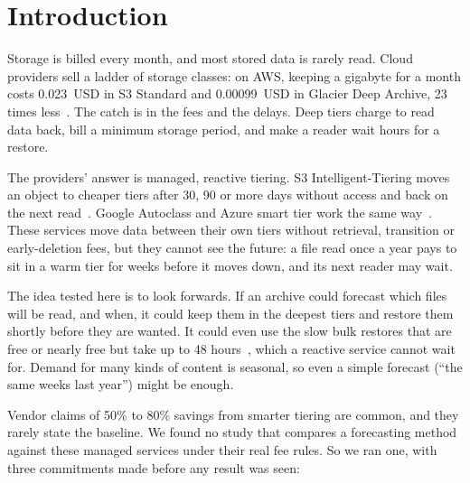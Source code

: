 \documentclass[11pt]{article}
\begin{document}
\vspace{0.3em}

\section{Introduction}

Storage is billed every month, and most stored data is rarely read. Cloud providers sell a ladder of storage classes: on AWS, keeping a gigabyte for a month costs 0.023~USD in S3 Standard and 0.00099~USD in Glacier Deep Archive, 23 times less~\cite{aws_s3_pricing}. The catch is in the fees and the delays. Deep tiers charge to read data back, bill a minimum storage period, and make a reader wait hours for a restore.

The providers' answer is managed, reactive tiering. S3 Intelligent-Tiering moves an object to cheaper tiers after 30, 90 or more days without access and back on the next read~\cite{aws_s3_it}. Google Autoclass and Azure smart tier work the same way~\cite{gcs_autoclass,azure_smart_tier}. These services move data between their own tiers without retrieval, transition or early-deletion fees, but they cannot see the future: a file read once a year pays to sit in a warm tier for weeks before it moves down, and its next reader may wait.

The idea tested here is to look forwards. If an archive could forecast which files will be read, and when, it could keep them in the deepest tiers and restore them shortly before they are wanted. It could even use the slow bulk restores that are free or nearly free but take up to 48 hours~\cite{aws_s3_restore}, which a reactive service cannot wait for. Demand for many kinds of content is seasonal, so even a simple forecast (``the same weeks last year'') might be enough.

Vendor claims of 50\% to 80\% savings from smarter tiering are common, and they rarely state the baseline. We found no study that compares a forecasting method against these managed services under their real fee rules. So we ran one, with three commitments made before any result was seen:
\end{document}

